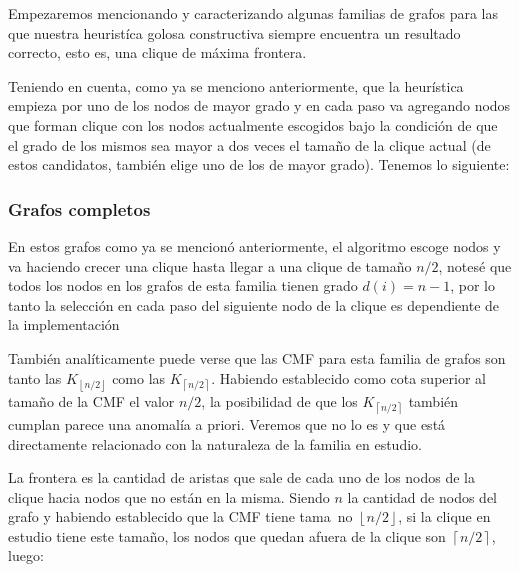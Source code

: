 Empezaremos mencionando y caracterizando algunas familias de grafos
para las que nuestra heurist\'ica golosa constructiva siempre encuentra
un resultado correcto, esto es, una clique de m\'axima frontera.

Teniendo en cuenta, como ya se menciono anteriormente, que la heur\'istica
empieza por uno de los nodos de mayor grado y en cada paso va 
agregando nodos que forman clique con los nodos actualmente escogidos
bajo la condici\'on de que el grado de los mismos sea mayor a dos veces
el tama\~no de la clique actual (de estos candidatos, tambi\'en elige
uno de los de mayor grado). Tenemos lo siguiente:

\subsubsection{Grafos completos}
	En estos grafos como ya se mencion\'o anteriormente, el algoritmo
	escoge nodos y va haciendo crecer una clique hasta llegar a una 
	clique de tama\~no $n/2$, notes\'e que todos los nodos en los 
	grafos de esta familia tienen grado $d(i) = n - 1$, por lo
	tanto la selecci\'on en cada paso del siguiente nodo de la
	clique es dependiente de la implementaci\'on

	Tambi\'en anal\'iticamente puede verse que las CMF para esta 
	familia de grafos son tanto las $K_{\left \lfloor{n/2}\right \rfloor}$ 
	como las $K_{\left \lceil{n/2}\right \rceil}$. Habiendo establecido como
	cota superior al tama\~no de la CMF el valor $n/2$, la posibilidad de que
	los $K_{\left \lceil{n/2}\right \rceil}$ tambi\'en cumplan parece una 
	anomal\'ia a priori. Veremos que no lo es y que est\'a directamente
	relacionado con la naturaleza de la familia en estudio. 

	La frontera es la cantidad de aristas que sale de cada uno de los
	nodos de la clique hacia nodos que no est\'an en la misma. Siendo
	$n$ la cantidad de nodos del grafo y habiendo establecido que la CMF
	tiene tama~no $\left \lfloor{n/2}\right \rfloor$, 
	si la clique en estudio tiene este tama\~no, los nodos que quedan afuera
	de la clique son $\left \lceil{n/2} \right \rceil$, luego: 

